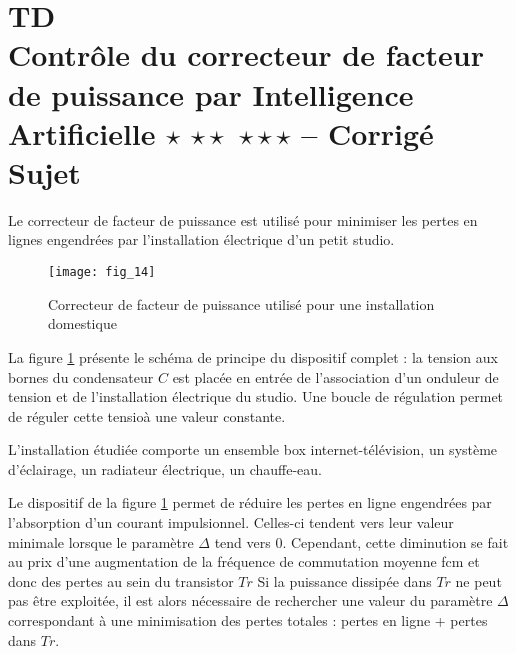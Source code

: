 \chapter*{TD  \\ 
Contrôle du correcteur de facteur de puissance par Intelligence Artificielle \ifnormal $\star$ \else \fi \ifdifficile $\star\star$ \else \fi \iftdifficile $\star\star\star$ \else \fi -- \ifprof Corrigé \else Sujet \fi}

\iflivret {} \else
\ifprof  {} \else \fi
\fi

\setcounter{question}{0}

Le correcteur de facteur de puissance est utilisé pour minimiser les pertes en lignes engendrées par l'installation électrique d'un petit studio. 

\begin{figure}[!h]
\centering
\texttt{[image: fig\_14]}
\caption{ Correcteur de facteur de puissance utilisé pour une installation domestique\label{Cy_07_ch_02_td_01_fig_14}}
\end{figure}
La figure \ref{Cy_07_ch_02_td_01_fig_14} présente le schéma de principe du dispositif complet : la tension aux bornes du condensateur $C$ est placée en entrée de l'association d'un onduleur de tension et de l'installation électrique du studio. Une boucle de régulation permet de réguler cette tensioà une valeur constante. 

L'installation étudiée comporte un ensemble box internet-télévision, un système d'éclairage, un radiateur électrique, un chauffe-eau.


Le dispositif de la figure \ref{Cy_07_ch_02_td_01_fig_14} permet de réduire les pertes
en ligne engendrées par l’absorption d’un courant impulsionnel. Celles-ci tendent vers leur
valeur minimale lorsque le paramètre $\Delta$ tend vers 0. Cependant, cette diminution se fait au
prix d’une augmentation de la fréquence de commutation moyenne fcm et donc des pertes
au sein du transistor $Tr$ %
Si la puissance dissipée dans $Tr$ ne peut pas être
exploitée, il est alors nécessaire de rechercher une valeur du paramètre $\Delta$ correspondant à
une minimisation des pertes totales : pertes en ligne + pertes dans $Tr$.

